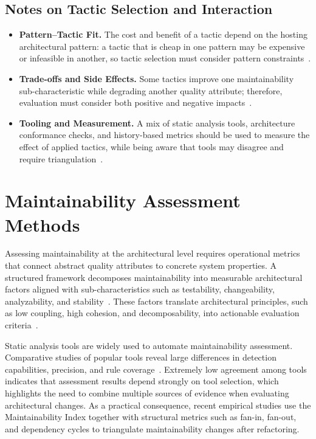 \subsection{Notes on Tactic Selection and Interaction}
\begin{itemize}
    \item \textbf{Pattern--Tactic Fit.} The cost and benefit of a tactic depend on the hosting architectural pattern: a tactic that is cheap in one pattern may be expensive or infeasible in another, so tactic selection must consider pattern constraints~\cite{harrison2010how}.
    \item \textbf{Trade-offs and Side Effects.} Some tactics improve one maintainability sub-characteristic while degrading another quality attribute; therefore, evaluation must consider both positive and negative impacts~\cite{bi2021mining}.
    \item \textbf{Tooling and Measurement.} A mix of static analysis tools, architecture conformance checks, and history-based metrics should be used to measure the effect of applied tactics, while being aware that tools may disagree and require triangulation~\cite{lenarduzzi2023critical}.
\end{itemize}

\section{Maintainability Assessment Methods}

Assessing maintainability at the architectural level requires operational metrics that connect abstract quality attributes to concrete system properties. A structured framework decomposes maintainability into measurable architectural factors aligned with sub-characteristics such as testability, changeability, analyzability, and stability~\cite{rahmati2021ensuring}. These factors translate architectural principles, such as low coupling, high cohesion, and decomposability, into actionable evaluation criteria~\cite{bass2021software}.

Static analysis tools are widely used to automate maintainability assessment. Comparative studies of popular tools reveal large differences in detection capabilities, precision, and rule coverage~\cite{lenarduzzi2023critical}. Extremely low agreement among tools indicates that assessment results depend strongly on tool selection, which highlights the need to combine multiple sources of evidence when evaluating architectural changes. As a practical consequence, recent empirical studies use the Maintainability Index together with structural metrics such as fan-in, fan-out, and dependency cycles to triangulate maintainability changes after refactoring.

